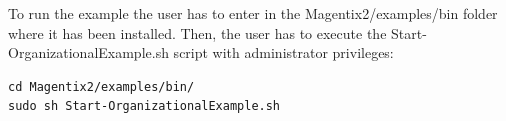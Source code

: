 To run the example the user has to enter in the Magentix2/examples/bin folder where it has been installed. Then,
the user has to execute the Start-OrganizationalExample.sh script with administrator privileges:

\begin{lstlisting}
cd Magentix2/examples/bin/
sudo sh Start-OrganizationalExample.sh
\end{lstlisting}
 
